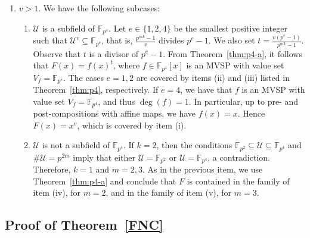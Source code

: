 \documentclass[11pt]{amsart}
\newcommand{\F}{\mathbb{F}}
\theoremstyle{definition}
\theoremstyle{remark}
\begin{document}
\begin{enumerate}[1.]
\begin{enumerate}
\end{enumerate}




\item $v>1$. We have the following subcases:

\begin{enumerate}
\item $\mathcal U$ is a subfield of $\F_{p^4}$. Let $e\in \{1, 2, 4\}$ be the smallest positive integer such that $\mathcal U^v\subseteq \F_{p^e}$, that is, $\frac{p^{mk}-1}{v}$ divides $p^e-1$. We also set $t=\frac{v(p^e-1)}{p^{mk}-1}$. Observe that $t$ is a divisor of $p^e-1$. From Theorem~\ref{thm:p4-a}, it follows that $F(x)=f(x)^t$, where $f\in \F_{p^4}[x]$ is an MVSP with value set $V_f=\F_{p^e}$. The cases $e=1, 2$ are covered by items (ii) and (iii) listed in  Theorem~\ref{thm:p4}, respectively. If $e=4$, we have that $f$ is an MVSP with value set $V_f=\F_{p^4}$, and thus $\deg(f)=1$. In particular, up to pre- and post-compositions with affine maps, we have $f(x)=x$. Hence $F(x)=x^v$, which is covered by item (i). 

\item $\mathcal U$ is not a subfield of $\F_{p^4}$. If $k=2$, then the conditions $\F_{p^2}\subseteq \mathcal U \subseteq \F_{p^4}$  and $\#\mathcal U=p^{2m}$ imply that  either $\mathcal U=\F_{p^2}$ or  $\mathcal U=\F_{p^4}$, a contradiction.  Therefore, $k=1$ and $m=2, 3$. As in  the previous item, we use Theorem~\ref{thm:p4-a} and conclude that $F$ is contained in the family of item (iv), for $m=2$, and in the family of item (v), for $m=3$. 

\end{enumerate}


\end{enumerate}



\subsection{Proof of Theorem~\ref{FNC}}
\end{document}
